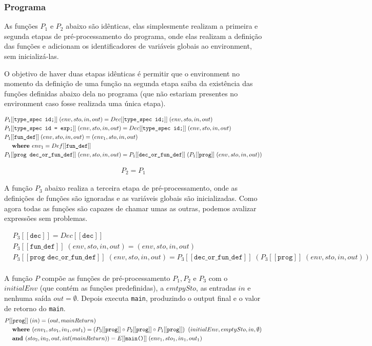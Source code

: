 \documentclass[12pt]{article}
\newcommand\eb[1]{[[\texttt{#1}]]}
\begin{document}
\subsubsection{Programa}

As funções $P_1$ e $P_2$ abaixo são idênticas, elas simplesmente realizam a primeira e segunda etapas de pré-processamento do programa, onde elas realizam a definição das funções e adicionam os identificadores de variáveis globais ao environment, sem inicializá-las.

 O objetivo de haver duas etapas idênticas é permitir que o environment no momento da definição de uma função na segunda etapa saiba da existência das funções definidas abaixo dela no programa (que não estariam presentes no environment caso fosse realizada uma única etapa).

\begin{align*}
&P_1\eb{type\_spec id;}\; (env,sto,in,out) = Dec\eb{type\_spec id;}\; (env,sto,in,out)\\
&P_1\eb{type\_spec id = exp;}\; (env,sto,in,out) = Dec\eb{type\_spec id;}\; (env,sto,in,out) \\
&P_1\eb{fun\_def}\;(env,sto,in,out) = (env_1,sto,in,out)\\
&\hspace{3ex}\textbf{where } env_1 = Def\eb{fun\_def} \\
&P_1\eb{prog dec\_or\_fun\_def}\;(env,sto,in,out) = P_1\eb{dec\_or\_fun\_def}\;(P_1\eb{prog}\;(env,sto,in,out))
\end{align*}

\begin{align*}
P_2 = P_1
\end{align*}

A função $P_3$ abaixo realiza a terceira etapa de pré-processamento, onde as definições de funções são ignoradas e as variáveis globais são inicializadas. Como agora todas as funções são capazes de chamar umas as outras, podemos avalizar expressões sem problemas.

\begin{align*}
&P_3\eb{dec} = Dec\eb{dec} \\
&P_3\eb{fun\_def}\;(env,sto,in,out) = (env,sto,in,out) \\
&P_3\eb{prog dec\_or\_fun\_def}\; (env,sto,in,out) = P_3\eb{dec\_or\_fun\_def}\; (P_3\eb{prog}\;(env,sto,in,out))\\
\end{align*}


A função $P$ compõe as funções de pré-processamento $P_1, P_2$ e $P_3$ com o $initialEnv$ (que contém as funções predefinidas), a $emtpySto$, as entradas $in$ e nenhuma saída $out = \emptyset$. Depois executa {\tt main}, produzindo o output final e o valor de retorno do {\tt main}.
\begin{align*}
&P\eb{prog}\; (in) = (out,mainReturn)\\
&\hspace{3ex}\textbf{where }(env_1,sto_1,in_1,out_1) = (P_3\eb{prog} \circ P_2\eb{prog} \circ P_1\eb{prog})\;\;(initialEnv,emptySto,in,\emptyset)\\
&\hspace{3ex}\textbf{and } (sto_2,in_2,out,int(mainReturn)) = E\eb{main()}\;(env_1,sto_1,in_1,out_1)
\end{align*}
\end{document}
